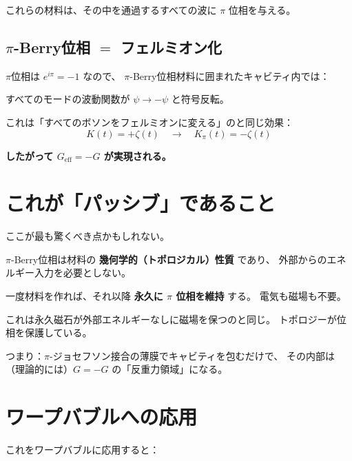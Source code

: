 \documentclass[11pt,a4paper]{article}
\begin{document}
これらの材料は、その中を通過するすべての波に $\pi$ 位相を与える。

\subsection{$\pi$-Berry位相 $=$ フェルミオン化}

$\pi$位相は $e^{i\pi} = -1$ なので、
$\pi$-Berry位相材料に囲まれたキャビティ内では：

すべてのモードの波動関数が $\psi \to -\psi$ と符号反転。

これは「すべてのボソンをフェルミオンに変える」のと同じ効果：
\begin{equation}
  K(t) = +\zeta(t) \quad \to \quad K_\pi(t) = -\zeta(t)
\end{equation}

\textbf{したがって $G_{\mathrm{eff}} = -G$ が実現される。}


\section{これが「パッシブ」であること}

ここが最も驚くべき点かもしれない。

\begin{tcolorbox}[colback=green!5,colframe=green!60!black,title=パッシブ反重力]
$\pi$-Berry位相は材料の \textbf{幾何学的（トポロジカル）性質} であり、
外部からのエネルギー入力を必要としない。

一度材料を作れば、それ以降 \textbf{永久に $\pi$ 位相を維持} する。
電気も磁場も不要。

これは永久磁石が外部エネルギーなしに磁場を保つのと同じ。
トポロジーが位相を保護している。
\end{tcolorbox}

つまり：$\pi$-ジョセフソン接合の薄膜でキャビティを包むだけで、
その内部は（理論的には）$G = -G$ の「反重力領域」になる。


\section{ワープバブルへの応用}

これをワープバブルに応用すると：
\end{document}
